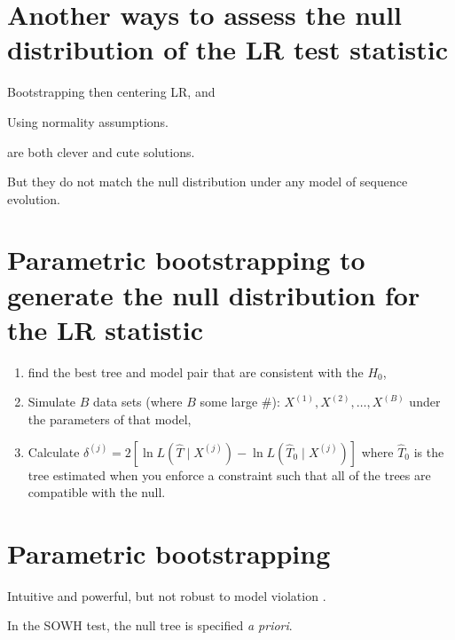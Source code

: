 \documentclass[landscape]{foils}
\begin{document}
\myNewSlide
\section*{Another ways to assess the null distribution of the LR test statistic}
\begin{compactitem}
	\item Bootstrapping then centering LR, and 
	\item Using normality assumptions.
\end{compactitem}
are both clever and cute solutions.

But they do not match the null distribution under any model of sequence evolution.

\myNewSlide
\section*{Parametric bootstrapping to generate the null distribution for the LR statistic}
\begin{enumerate}
	\item find the best tree and model pair that are consistent with the $H_0$,
	\item Simulate $B$ data sets (where $B$ some large \#): $X^{(1)}, X^{(2)},\ldots,X^{(B)}$ under the parameters of that model,
	\item Calculate $\delta^{(j)} = 2\left[\ln L (\hat{T} \mid  X^{(j)}) - \ln L (\hat{T}_{0} \mid  X^{(j)})\right]$ where $\hat{T}_{0}$ is the tree estimated when you enforce a constraint such that all of the trees are compatible with the null.
\end{enumerate}

\myNewSlide
\section*{Parametric bootstrapping}
Intuitive and powerful, but not robust to model violation \citep{Buckley2002}.

In the SOWH test, the null tree is specified {\em a priori}.

\myNewSlide
 


\myNewSlide
 

\myNewSlide
\end{document}
